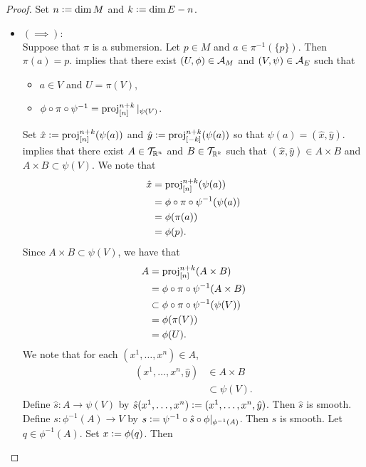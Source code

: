 \documentclass{book}
\begin{document}
	\begin{proof} 
		Set $n \vcentcolon= \dim M$ and $k \vcentcolon= \dim E - n$.
		\begin{itemize}
			\item $(\implies):$ \\
			Suppose that $\pi$ is a submersion.  Let $p \in M$ and $a \in \pi^{-1}(\{p\})$. Then $\pi(a) = p$.  implies that there exist $(U, \phi) \in \mathcal{A}_M$ and $(V, \psi) \in \mathcal{A}_E$ such that 
			\begin{itemize}
				\item $a \in V$ and $U = \pi(V)$,
				\item $\phi \circ \pi \circ \psi^{-1} = \operatorname{\text{proj}}^{n+k}_{[n]}|_{\psi(V)}$. 
			\end{itemize} 
			Set $\hat{x} \vcentcolon= \operatorname{\text{proj}}^{n+k}_{[n]}(\psi(a))$ and $\hat{y} \vcentcolon= \operatorname{\text{proj}}^{n+k}_{[-k]}(\psi(a))$ so that $\psi(a) = (\hat{x}, \hat{y})$.  implies that there exist $A \in \mathcal{T}_{\mathbb{R}^n}$ and $B \in \mathcal{T}_{\mathbb{R}^k}$ such that $(\hat{x}, \hat{y}) \in A \times B$ and $A \times B \subset \psi(V)$. We note that 
			\begin{align*}
				\hat{x} 
				& = \operatorname{\text{proj}}^{n+k}_{[n]}(\psi(a)) \\
				& = \phi \circ \pi \circ \psi^{-1}(\psi(a)) \\
				& = \phi (\pi(a)) \\
				& = \phi(p).
			\end{align*}
			Since $A \times B \subset \psi(V)$, we have that
			\begin{align*}
				A 
				& = \operatorname{\text{proj}}^{n+k}_{[n]}(A \times B) \\
				& = \phi \circ \pi \circ \psi^{-1}(A \times B) \\
				& \subset \phi \circ \pi \circ \psi^{-1}(\psi(V)) \\
				& = \phi ( \pi(V)) \\ 
				& = \phi(U).
			\end{align*}
			We note that for each $(x^1, \ldots, x^n) \in A$, 
			\begin{align*}
				(x^1, \ldots, x^n, \hat{y})
				& \in A \times B \\
				& \subset \psi(V).
			\end{align*}
			Define $\hat{s}:A \rightarrow \psi(V)$ by $\hat{s}(x^1, \ldots, x^n) \vcentcolon= (x^1, \ldots, x^n, \hat{y})$. Then $\hat{s}$ is smooth. Define $s:\phi^{-1}(A) \rightarrow V$ by $s \vcentcolon= \psi^{-1} \circ \hat{s} \circ \phi|_{\phi^{-1}(A)}$. Then $s$ is smooth. Let $q \in \phi^{-1}(A)$. Set $x \vcentcolon= \phi(q)$. Then 

\end{itemize}
\end{proof}
\end{document}
